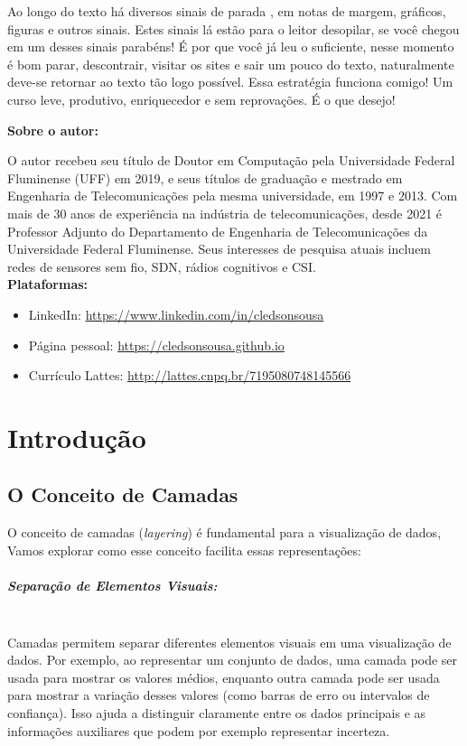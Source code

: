 \documentclass[article]{memoir}
\begin{document}
Ao longo do texto há diversos sinais de parada , em notas de margem, gráficos, figuras e outros sinais. Estes sinais lá estão  para o leitor desopilar, se você chegou em um desses sinais parabéns! É por que você já leu o suficiente, nesse momento é bom parar, descontrair, visitar os sites e sair um pouco do texto, naturalmente deve-se retornar ao texto tão logo possível. Essa estratégia funciona comigo!
Um curso leve, produtivo, enriquecedor e sem reprovações. É o que desejo!

\textbf{Sobre o autor:}

O autor recebeu seu título de Doutor em Computação pela Universidade Federal Fluminense (UFF) em 2019, e seus títulos de graduação e mestrado em Engenharia de Telecomunicações pela mesma universidade, em 1997 e 2013. Com mais de 30 anos de experiência na indústria de telecomunicações, desde 2021 é Professor Adjunto do Departamento de Engenharia de Telecomunicações da Universidade Federal Fluminense. Seus interesses de pesquisa atuais incluem redes de sensores sem fio, SDN, rádios cognitivos e CSI.\mbox{}\\

\textbf{Plataformas:}

\begin{itemize}
	\item LinkedIn: \url{https://www.linkedin.com/in/cledsonsousa}
	\item Página pessoal: \url{https://cledsonsousa.github.io}
	\item Currículo Lattes: \url{http://lattes.cnpq.br/7195080748145566}
\end{itemize}

\newpage
\chapter{Introdução}
\section{O Conceito de Camadas}
O conceito de camadas (\textit{layering}) é fundamental para a visualização de dados, Vamos explorar como esse conceito facilita essas representações:

\paragraph*{Separação de Elementos Visuais:}\mbox{}\\
Camadas permitem separar diferentes elementos visuais em uma visualização de dados. Por exemplo, ao representar um conjunto de dados, uma camada pode ser usada para mostrar os valores médios, enquanto outra camada pode ser usada para mostrar a variação desses valores (como barras de erro ou intervalos de confiança). Isso ajuda a distinguir claramente entre os dados principais e as informações auxiliares que podem por exemplo  representar incerteza.
\end{document}
